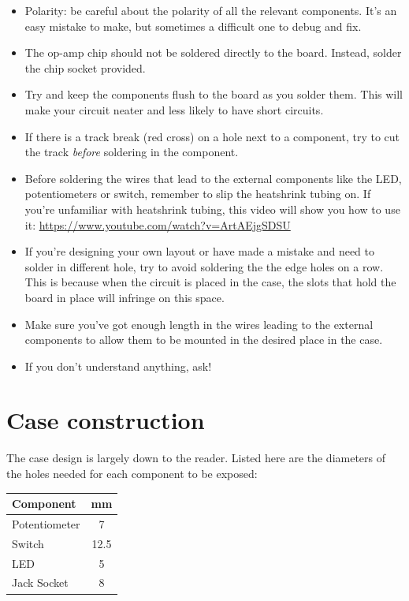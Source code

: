 \documentclass[a4paper]{article}
\begin{document}
		\begin{itemize}
			\item 	Polarity: be careful about the polarity of all the relevant components.
					It's an easy mistake to make, but sometimes a difficult one to debug and fix.
					
			\item	The op-amp chip should not be soldered directly to the board. Instead, solder 
					the chip socket provided.
					
			\item	Try and keep the components flush to the board as you solder them. This will make 
					your circuit neater and less likely to have short circuits. 
			
			\item 	If there is a track break (red cross) on a hole next to a component, try
					to cut the track \textit{before} soldering in the component. 
					
			\item	Before soldering the wires that lead to the external components like the LED, 
					potentiometers or switch, remember to slip the heatshrink tubing on. If you're
					unfamiliar with heatshrink tubing, this video will show you how to use it: 
					\url{https://www.youtube.com/watch?v=ArtAEjgSDSU}
					
			\item 	If you're designing your own layout or have made a mistake and need to solder in
					different hole, try to avoid soldering the the edge holes on a row. This is because 
					when the circuit is placed in the case, the slots that hold the board in place will 
					infringe on this space. 
					
			\item	Make sure you've got enough length in the wires leading to the external components 
					to allow them to be mounted in the desired place in the case.
					
			\item If you don't understand anything, ask! 
		\end{itemize}
		
\section{Case construction}
	The case design is largely down to the reader. Listed here are the diameters of the holes needed
	for each component to be exposed:
	\begin{table}[h]
		\centering
		\begin{tabular}{lc}
			\textbf{Component}  & \textbf{\diameter mm} \\ \hline
			Potentiometer  & 7              \\
			Switch         & 12.5           \\
			LED            & 5             \\
			Jack Socket    & 8            
		\end{tabular}
	\end{table}
\end{document}
